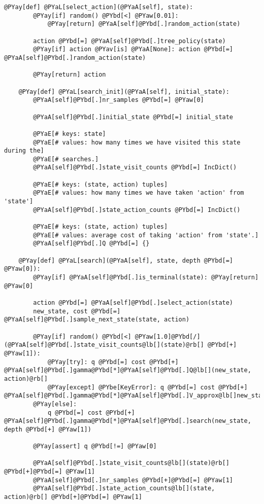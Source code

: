 \begin{Verbatim}[commandchars=@\[\]]
    @PYay[def] @PYaL[select_action](@PYaA[self], state):
        @PYay[if] random() @PYbd[<] @PYaw[0.01]:
            @PYay[return] @PYaA[self]@PYbd[.]random_action(state)

        action @PYbd[=] @PYaA[self]@PYbd[.]tree_policy(state)
        @PYay[if] action @PYav[is] @PYaA[None]: action @PYbd[=] @PYaA[self]@PYbd[.]random_action(state)

        @PYay[return] action

    @PYay[def] @PYaL[search_init](@PYaA[self], initial_state):
        @PYaA[self]@PYbd[.]nr_samples @PYbd[=] @PYaw[0]

        @PYaA[self]@PYbd[.]initial_state @PYbd[=] initial_state

        @PYaE[# keys: state]
        @PYaE[# values: how many times we have visited this state during the]
        @PYaE[# searches.]
        @PYaA[self]@PYbd[.]state_visit_counts @PYbd[=] IncDict()

        @PYaE[# keys: (state, action) tuples]
        @PYaE[# values: how many times we have taken 'action' from 'state']
        @PYaA[self]@PYbd[.]state_action_counts @PYbd[=] IncDict()

        @PYaE[# keys: (state, action) tuples]
        @PYaE[# values: average cost of taking 'action' from 'state'.]
        @PYaA[self]@PYbd[.]Q @PYbd[=] {}

    @PYay[def] @PYaL[search](@PYaA[self], state, depth @PYbd[=] @PYaw[0]):
        @PYay[if] @PYaA[self]@PYbd[.]is_terminal(state): @PYay[return] @PYaw[0]

        action @PYbd[=] @PYaA[self]@PYbd[.]select_action(state)
        new_state, cost @PYbd[=] @PYaA[self]@PYbd[.]sample_next_state(state, action)

        @PYay[if] random() @PYbd[<] @PYaw[1.0]@PYbd[/](@PYaA[self]@PYbd[.]state_visit_counts@lb[](state)@rb[] @PYbd[+] @PYaw[1]):
            @PYay[try]: q @PYbd[=] cost @PYbd[+] @PYaA[self]@PYbd[.]gamma@PYbd[*]@PYaA[self]@PYbd[.]Q@lb[](new_state, action)@rb[]
            @PYay[except] @PYbe[KeyError]: q @PYbd[=] cost @PYbd[+] @PYaA[self]@PYbd[.]gamma@PYbd[*]@PYaA[self]@PYbd[.]V_approx@lb[]new_state@rb[]
        @PYay[else]:
            q @PYbd[=] cost @PYbd[+] @PYaA[self]@PYbd[.]gamma@PYbd[*]@PYaA[self]@PYbd[.]search(new_state, depth @PYbd[+] @PYaw[1])

        @PYay[assert] q @PYbd[!=] @PYaw[0]

        @PYaA[self]@PYbd[.]state_visit_counts@lb[](state)@rb[] @PYbd[+]@PYbd[=] @PYaw[1]
        @PYaA[self]@PYbd[.]nr_samples @PYbd[+]@PYbd[=] @PYaw[1]
        @PYaA[self]@PYbd[.]state_action_counts@lb[](state, action)@rb[] @PYbd[+]@PYbd[=] @PYaw[1]


\end{Verbatim}
